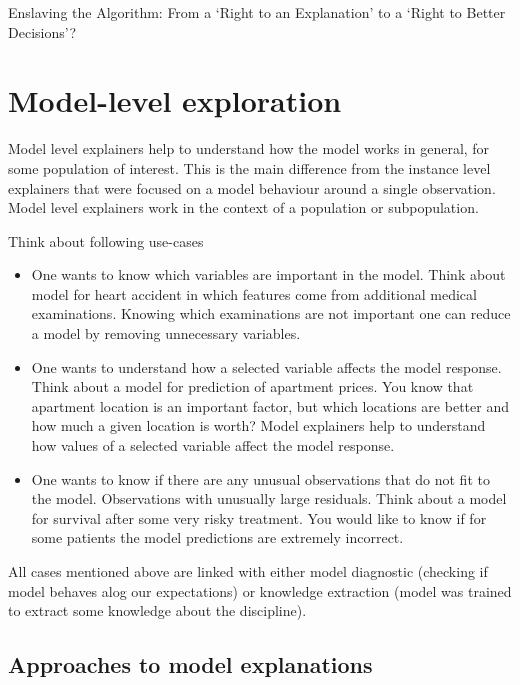 \documentclass[12pt,]{krantz}
\providecommand{\tightlist}{%
  \setlength{\itemsep}{0pt}\setlength{\parskip}{0pt}}
\theoremstyle{definition}
\theoremstyle{definition}
\theoremstyle{definition}
\theoremstyle{remark}
\begin{document}
Enslaving the Algorithm: From a `Right to an Explanation' to a `Right to
Better Decisions'? \citep{Edwards_Veale_2018}

\hypertarget{modelLevelExploration}{%
\section{Model-level exploration}\label{modelLevelExploration}}

Model level explainers help to understand how the model works in
general, for some population of interest. This is the main difference
from the instance level explainers that were focused on a model
behaviour around a single observation. Model level explainers work in
the context of a population or subpopulation.

Think about following use-cases

\begin{itemize}
\tightlist
\item
  One wants to know which variables are important in the model. Think
  about model for heart accident in which features come from additional
  medical examinations. Knowing which examinations are not important one
  can reduce a model by removing unnecessary variables.
\item
  One wants to understand how a selected variable affects the model
  response. Think about a model for prediction of apartment prices. You
  know that apartment location is an important factor, but which
  locations are better and how much a given location is worth? Model
  explainers help to understand how values of a selected variable affect
  the model response.
\item
  One wants to know if there are any unusual observations that do not
  fit to the model. Observations with unusually large residuals. Think
  about a model for survival after some very risky treatment. You would
  like to know if for some patients the model predictions are extremely
  incorrect.
\end{itemize}

All cases mentioned above are linked with either model diagnostic
(checking if model behaves alog our expectations) or knowledge
extraction (model was trained to extract some knowledge about the
discipline).

\hypertarget{approaches-to-model-explanations}{%
\subsection{Approaches to model
explanations}\label{approaches-to-model-explanations}}
\end{document}
